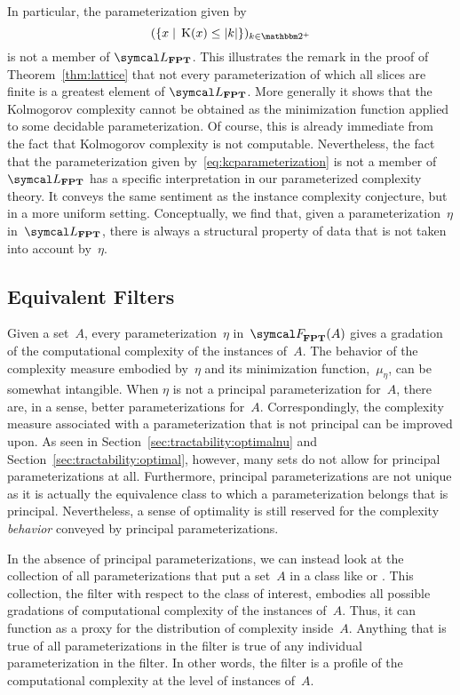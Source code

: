 In particular, the parameterization given by
\begin{equation}
\label{eq:kcparameterization}
  (\{x \st \KC(x) \le \length{k}\})_{k \in \binary^+}
\end{equation}
is not a member of $\calL_\cl{FPT}$.
This illustrates the remark in the proof of Theorem~\ref{thm:lattice} that not every parameterization of which all slices are finite is a greatest element of $\calL_\cl{FPT}$.
More generally it shows that the Kolmogorov complexity cannot be obtained as the minimization function applied to some decidable parameterization.
Of course, this is already immediate from the fact that Kolmogorov complexity is not computable.
Nevertheless, the fact that the parameterization given by~\eqref{eq:kcparameterization} is not a member of $\calL_\cl{FPT}$ has a specific interpretation in our parameterized complexity theory.
It conveys the same sentiment as the instance complexity conjecture, but in a more uniform setting.
Conceptually, we find that, given a parameterization~$\eta$ in~$\calL_\cl{FPT}$, there is always a structural property of data that is not taken into account by~$\eta$.

\subsection{Equivalent Filters}
\label{sec:algorithmic:equivalent_filters}%
Given a set~$A$, every parameterization~$\eta$ in~$\calF_\cl{FPT}(A)$ gives a gradation of the computational complexity of the instances of~$A$.
The behavior of the complexity measure embodied by~$\eta$ and its minimization function,~$\mu_\eta$, can be somewhat intangible.
When $\eta$ is not a principal parameterization for~$A$, there are, in a sense, better parameterizations for~$A$.
Correspondingly, the complexity measure associated with a parameterization that is not principal can be improved upon.
As seen in Section~\ref{sec:tractability:optimalnu} and Section~\ref{sec:tractability:optimal}, however, many sets do not allow for principal parameterizations at all.
Furthermore, principal parameterizations are not unique as it is actually the equivalence class to which a parameterization belongs that is principal.
Nevertheless, a sense of optimality is still reserved for the complexity \emph{behavior} conveyed by principal parameterizations.

In the absence of principal parameterizations, we can instead look at the collection of all parameterizations that put a set~$A$ in a class like  or .
This collection, the filter with respect to the class of interest, embodies all possible gradations of computational complexity of the instances of~$A$.
Thus, it can function as a proxy for the distribution of complexity inside~$A$.
Anything that is true of all parameterizations in the filter is true of any individual parameterization in the filter.
In other words, the filter is a profile of the computational complexity at the level of instances of~$A$.

